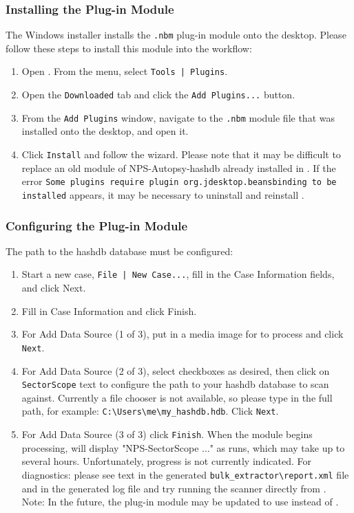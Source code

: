\documentclass[11pt,fleqn]{article} %
\begin{document}
\subsubsection{Installing the \sscope \aut Plug-in Module}
\label{installingNBM}
The \sscope Windows installer installs the \verb+.nbm+ \sscope \aut plug-in module onto the desktop. Please follow these steps to install this module into the \aut workflow:
\begin{enumerate}
\item Open \aut. From the \aut menu, select \verb+Tools | Plugins+.
\item Open the \verb+Downloaded+ tab and click the \verb+Add Plugins...+ button.
\item From the \verb+Add Plugins+ window, navigate to the \verb+.nbm+ module file that was installed onto the desktop, and open it.
\item Click \verb+Install+ and follow the wizard. Please note that it may be difficult to replace an old module of NPS-Autopsy-hashdb already installed in \aut. If the error \verb+Some plugins require plugin org.jdesktop.beansbinding to be installed+ appears, it may be necessary to uninstall and reinstall \aut.
\end{enumerate}

\subsubsection{Configuring the \sscope \aut Plug-in Module}
\label{configuringNBM}
The path to the hashdb database must be configured:
\begin{enumerate}
\item Start a new case, \verb+File | New Case...+, fill in the Case Information fields, and click Next.
\item Fill in Case Information and click Finish.
\item For Add Data Source (1 of 3), put in a media image for \aut to process and click \verb+Next+.
\item For Add Data Source (2 of 3), select checkboxes as desired, then click on \verb+SectorScope+ text to configure the path to your hashdb database to scan against. Currently a file chooser is not available, so please type in the full path, for example: \verb+C:\Users\me\my_hashdb.hdb+. Click \verb+Next+.
\item For Add Data Source (3 of 3) click \verb+Finish+. When the \sscope module begins processing, \aut will display "NPS-SectorScope ..." as \bulk runs, which may take up to several hours. Unfortunately, \bulk progress is not currently indicated. For diagnostics: please see text in the generated \verb+bulk_extractor\report.xml+ file and in the generated log file and try running the \bulk scanner directly from \sscope.\\

Note: In the future, the \sscope \aut plug-in module may be updated to use \hdb instead of \bulk.
\end{enumerate}
\end{document}
